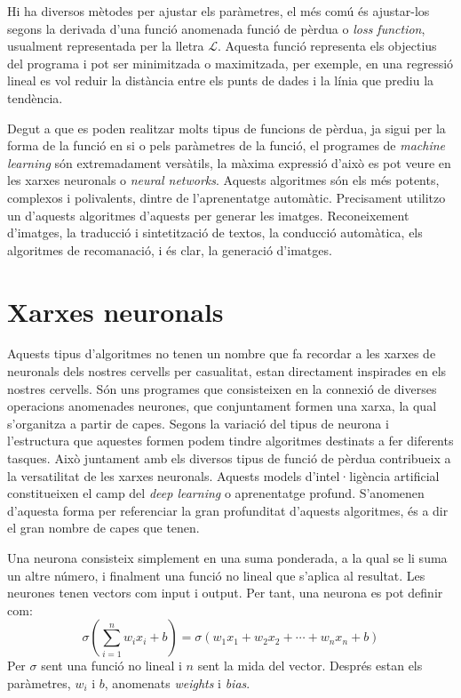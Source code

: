 Hi ha diversos mètodes per ajustar els paràmetres, el més comú és ajustar-los segons la derivada d'una funció anomenada funció de pèrdua o \textit{loss function}, usualment representada per la lletra $\mathcal{L}$. Aquesta funció representa els objectius del programa i pot ser minimitzada o maximitzada, per exemple, en una regressió lineal es vol reduir la distància entre els punts de dades i la línia que prediu la tendència.

Degut a que es poden realitzar molts tipus de funcions de pèrdua, ja sigui per la forma de la funció en si o pels paràmetres de la funció, el programes de \textit{machine learning} són extremadament versàtils, la màxima expressió d'això es pot veure en les xarxes neuronals o \textit{neural networks}. Aquests algoritmes són els més potents, complexos i polivalents, dintre de l'aprenentatge automàtic. Precisament utilitzo un d'aquests algoritmes d'aquests per generar les imatges. Reconeixement d'imatges, la traducció i sintetització de textos, la conducció automàtica, els algoritmes de recomanació, i és clar, la generació d'imatges.

\section{Xarxes neuronals}
Aquests tipus d'algoritmes no tenen un nombre que fa recordar a les xarxes de neuronals dels nostres cervells per casualitat, estan directament inspirades en els nostres cervells. Són uns programes que consisteixen en la connexió de diverses operacions anomenades neurones, que conjuntament formen una xarxa, la qual s'organitza a partir de capes. Segons la variació del tipus de neurona i l'estructura que aquestes formen podem tindre algoritmes destinats a fer diferents tasques. Això juntament amb els diversos tipus de funció de pèrdua contribueix a la versatilitat de les xarxes neuronals. Aquests models d'intel·ligència artificial constitueixen el camp del \textit{deep learning} o aprenentatge profund. S'anomenen d'aquesta forma per referenciar la gran profunditat d'aquests algoritmes, és a dir el gran nombre de capes que tenen.

Una neurona consisteix simplement en una suma ponderada, a la qual se li suma un altre número, i finalment una funció no lineal que s'aplica al resultat. Les neurones tenen vectors com input i output. Per tant, una neurona es pot definir com:
$$
\sigma \left(\sum_{i=1}^n w_i x_i + b\right) = \sigma \left( w_1x_1 + w_2x_2 + \cdots + w_nx_n + b 
\right) 
$$
Per $\sigma$ sent una funció no lineal i $n$ sent la mida del vector. Després estan els paràmetres, $w_i$ i $b$, anomenats \textit{weights} i \textit{bias}.

